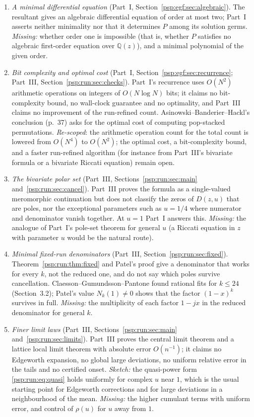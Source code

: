 \documentclass[11pt,letterpaper]{article}
\numberwithin{equation}{section}
\theoremstyle{remark}\newtheorem{remark}[theorem]{Remark}
\newcommand{\QQ}{\mathbb Q}
\begin{document}
\begin{enumerate}
\item\label{psp:q:ode} \emph{A minimal differential equation} (Part~I, Section~\ref{psp:egf:sec:algebraic}). The resultant gives an algebraic differential equation of order at most two; Part~I asserts neither minimality nor that it determines $P$ among its solution germs. \emph{Missing:} whether order one is impossible (that is, whether $P$ satisfies no algebraic first-order equation over $\QQ(z)$), and a minimal polynomial of the given order.
\item\label{psp:q:complexity} \emph{Bit complexity and optimal cost} (Part~I, Section~\ref{psp:egf:sec:recurrence}; Part~III, Section~\ref{psp:run:sec:checks}). Part~I's recurrence uses $O(N^2)$ arithmetic operations on integers of $O(N\log N)$ bits; it claims no bit-complexity bound, no wall-clock guarantee and no optimality, and Part~III claims no improvement of the run-refined count. Asinowski--Banderier--Hackl's conclusion (p.~37) asks for the optimal cost of computing pop-stacked permutations. \emph{Re-scoped}: the arithmetic operation count for the total count is lowered from $O(N^4)$ to $O(N^2)$; the optimal cost, a bit-complexity bound, and a faster run-refined algorithm (for instance from Part~III's bivariate formula or a bivariate Riccati equation) remain open.
\item\label{psp:q:polar} \emph{The bivariate polar set} (Part~III, Sections~\ref{psp:run:sec:main} and~\ref{psp:run:sec:cancel}). Part~III proves the formula as a single-valued meromorphic continuation but does not classify the zeros of $D(z,u)$ that are poles, nor the exceptional parameters such as $u=1/4$ where numerator and denominator vanish together. At $u=1$ Part~I answers this. \emph{Missing:} the analogue of Part~I's pole-set theorem for general $u$ (a Riccati equation in $z$ with parameter $u$ would be the natural route).
\item\label{psp:q:denominators} \emph{Minimal fixed-run denominators} (Part~III, Section~\ref{psp:run:sec:fixed}). Theorem~\ref{psp:run:thm:fixed} and Patel's proof give a denominator that works for every $k$, not the reduced one, and do not say which poles survive cancellation. Claesson--Gu\dh mundsson--Pantone found rational fits for $k\le24$ (Section~3.2); Patel's value $N_k(1)\ne0$ shows that the factor $(1-x)^k$ survives in full. \emph{Missing:} the multiplicity of each factor $1-jx$ in the reduced denominator for general $k$.
\item\label{psp:q:limits} \emph{Finer limit laws} (Part~III, Sections~\ref{psp:run:sec:main} and~\ref{psp:run:sec:limits}). Part~III proves the central limit theorem and a lattice local limit theorem with absolute error $O(n^{-1})$; it claims no Edgeworth expansion, no global large deviations, no uniform relative error in the tails and no certified onset. \emph{Sketch:} the quasi-power form \eqref{psp:run:eq:quasi} holds uniformly for complex $u$ near $1$, which is the usual starting point for Edgeworth corrections and for large deviations in a neighbourhood of the mean. \emph{Missing:} the higher cumulant terms with uniform error, and control of $\rho(u)$ for $u$ away from $1$.

\end{enumerate}
\end{document}
